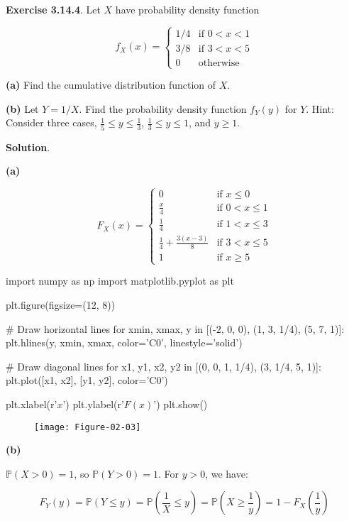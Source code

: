 \textbf{Exercise 3.14.4}. Let \(X\) have probability density function

\[ f_X(x) = 
\begin{cases}
1/4 &\text{if } 0 < x < 1 \\
3/8 &\text{if } 3 < x < 5 \\
0   &\text{otherwise}
\end{cases} \]

\textbf{(a)} Find the cumulative distribution function of \(X\).

\textbf{(b)} Let \(Y = 1 / X\). Find the probability density function
\(f_Y(y)\) for \(Y\). Hint: Consider three cases,
\(\frac{1}{5} \leq y \leq \frac{1}{3}\), \(\frac{1}{3} \leq y \leq 1\),
and \(y \geq 1\).

\textbf{Solution}.

\textbf{(a)}

\[ 
F_X(x) = 
\begin{cases}
0 &\text{if } x \leq 0 \\
\frac{x}{4} &\text{if } 0 < x \leq 1 \\
\frac{1}{4} &\text{if } 1 < x \leq 3 \\
\frac{1}{4} + \frac{3(x - 3)}{8} &\text{if } 3 < x \leq 5 \\
1 &\text{if } x \geq 5
\end{cases} 
\]

\begin{python}
import numpy as np
import matplotlib.pyplot as plt

plt.figure(figsize=(12, 8))

# Draw horizontal lines
for xmin, xmax, y in [(-2, 0, 0), (1, 3, 1/4), (5, 7, 1)]:
    plt.hlines(y, xmin, xmax, color='C0', linestyle='solid')
    
# Draw diagonal lines
for x1, y1, x2, y2 in [(0, 0, 1, 1/4), (3, 1/4, 5, 1)]:
    plt.plot([x1, x2], [y1, y2], color='C0')
    
plt.xlabel(r'$x$')
plt.ylabel(r'$F(x)$')
plt.show()
\end{python}

\begin{figure}[H]
\centering
\texttt{[image: Figure-02-03]}
\end{figure}

\textbf{(b)}

\(\mathbb{P}(X > 0) = 1\), so \(\mathbb{P}(Y > 0) = 1\). For \(y > 0\),
we have:

\[ F_Y(y) = \mathbb{P}(Y \leq y) = \mathbb{P}\left(\frac{1}{X} \leq y\right) = \mathbb{P}\left(X \geq \frac{1}{y}\right) = 1 - F_X\left(\frac{1}{y} \right) \]

